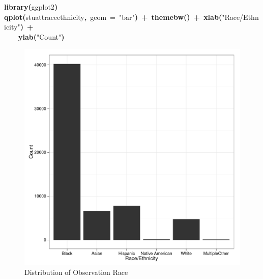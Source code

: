 \documentclass[12pt]{article}
\makeatletter
\newcommand{\hlfunctioncall}[1]{\textcolor[rgb]{0.501960784313725,0,0.329411764705882}{\textbf{#1}}}%
\newcommand{\hlstring}[1]{\textcolor[rgb]{0.6,0.6,1}{#1}}%
\newcommand{\hlkeyword}[1]{\textcolor[rgb]{0,0,0}{\textbf{#1}}}%
\newcommand{\hlargument}[1]{\textcolor[rgb]{0.690196078431373,0.250980392156863,0.0196078431372549}{#1}}%
\newcommand{\hlsymbol}[1]{\textcolor[rgb]{0,0,0}{#1}}%
\newcommand{\hlstd}[1]{\textcolor[rgb]{0,0,0}{#1}}%
\newenvironment{kframe}{%
 \def\FrameCommand##1{\hskip\@totalleftmargin \hskip-\fboxsep
 \colorbox{shadecolor}{##1}\hskip-\fboxsep
     \hskip-\linewidth \hskip-\@totalleftmargin \hskip\columnwidth}%
 \MakeFramed {\advance\hsize-\width
   \@totalleftmargin\z@ \linewidth\hsize
   \@setminipage}}%
 {\par\unskip\endMakeFramed}
\newenvironment{knitrout}{}{} %
\renewenvironment{knitrout}{\begin{footnotesize}}{\end{footnotesize}}
\makeatother
\begin{document}
\begin{knitrout}
\color{fgcolor}\begin{kframe}
\begin{flushleft}
\ttfamily\noindent
\hlfunctioncall{library}\hlkeyword{(}\hlsymbol{ggplot2}\hlkeyword{)}\hspace*{\fill}\\
\hlstd{}\hlfunctioncall{qplot}\hlkeyword{(}\hlsymbol{stuatt}\hlkeyword{\usebox{\hlnormalsizeboxdollar}}\hlsymbol{race\usebox{\hlnormalsizeboxunderscore}ethnicity}\hlkeyword{,}{\ }\hlargument{geom}{\ }\hlargument{=}{\ }\hlstring{"{}bar"{}}\hlkeyword{)}{\ }\hlkeyword{+}{\ }\hlfunctioncall{theme\usebox{\hlnormalsizeboxunderscore}bw}\hlkeyword{(}\hlkeyword{)}{\ }\hlkeyword{+}{\ }\hlfunctioncall{xlab}\hlkeyword{(}\hlstring{"{}Race/Ethnicity"{}}\hlkeyword{)}{\ }\hlkeyword{+}\hspace*{\fill}\\
\hlstd{}{\ }{\ }{\ }{\ }\hlfunctioncall{ylab}\hlkeyword{(}\hlstring{"{}Count"{}}\hlkeyword{)}\mbox{}
\normalfont
\end{flushleft}
\end{kframe}\begin{figure}[h]


{\centering \includegraphics[width=.8\textwidth,height=.2\paperheight]{figure/unnamed-chunk-9} 

}

\caption[Distribution of Observation Race]{Distribution of Observation Race\label{fig:unnamed-chunk-9}}
\end{figure}

\end{knitrout}
\end{document}
